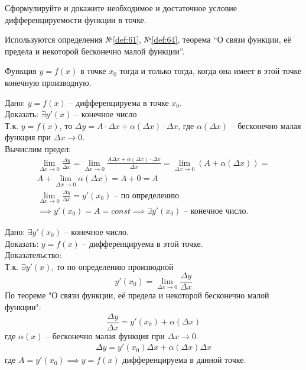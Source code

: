 \begin{question}
    Сформулируйте и докажите необходимое и достаточное условие дифференцируемости функции в точке.
\end{question}
\begin{used}
    Используются определения №\ref{def:61}, №\ref{def:64}, теорема ``О связи функции, её предела и некоторой бесконечно малой функции''.
\end{used}
\begin{theorem}
    Функция $y = f(x)$ в точке  $x_0$ тогда и только тогда, когда она имеет в этой точке конечную производную.
\end{theorem}
\begin{necessity}
    Дано: $y = f(x)$ -- дифференцируема в точке  $x_0$. \\
    Доказать: $\exists  y'(x)$ -- конечное число \\
    Т.к. $y = f(x)$, то  $\Delta y = A \cdot \Delta x + \alpha(\Delta x) \cdot \Delta x$, где $\alpha(\Delta x)$ -- бесконечно малая функция при $\Delta x \to 0$. \\
    Вычислим предел: 
    \begin{gather*}
        \lim_{\Delta x \to 0} \frac{\Delta y}{\Delta x} = \lim_{\Delta x \to 0} \frac{A \Delta x + \alpha(\Delta x) \cdot \Delta x}{\Delta x} = \lim_{\Delta x \to 0} \left( A + \alpha(\Delta x) \right)  = \\
        A + \lim_{\Delta x \to 0} \alpha(\Delta x) = A + 0 = A \\
        \lim_{\Delta x \to 0} \frac{\Delta y}{\Delta x} = y'(x_0) \text{ -- по определению} \\
        \implies y'(x_0) = A = const \implies \exists  y'(x_0) \text{ -- конечное число}.
    \end{gather*}
\end{necessity}
\begin{sufficiency}
    Дано: $\exists y'(x_0)$ -- конечное число. \\
    Доказать: $y = f(x)$ -- дифференцируема в этой точке. \\
    Доказательство: \\
    Т.к. $\exists y'(x)$, то по определению производной  \[
        y'(x_{0}) = \lim_{\Delta x \to 0} \frac{\Delta y}{\Delta x}
    \]
    По теореме "О связи функции, её предела и некоторой бесконечно малой функции": \[
    \frac{\Delta y}{\Delta x} = y'(x_0) + \alpha(\Delta x)
    \] 
    где $\alpha(x)$ -- бесконечно малая функция при $\Delta x \to 0$.
    \begin{gather*}
        \Delta y = y'(x_0) \Delta x + \alpha(\Delta x) \Delta x
    \end{gather*}
    где $A = y'(x_0) \implies y = f(x)$ дифференцируема в данной точке.
\end{sufficiency}
\pagebreak



